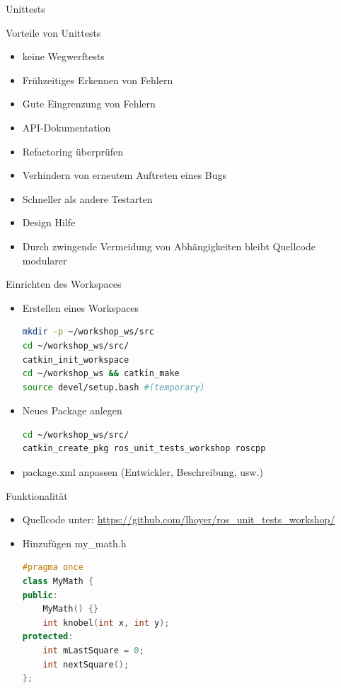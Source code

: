 \documentclass{beamer}
\begin{document}
\begin{frame}{Unittests}
	\begin{block}{Vorteile von Unittests}
	\begin{itemize}
		\pause
		\item keine Wegwerftests
		\item Frühzeitiges Erkennen von Fehlern
		\item Gute Eingrenzung von Fehlern
		\item API-Dokumentation
		\item Refactoring überprüfen
		\item Verhindern von erneutem Auftreten eines Bugs
		\item Schneller als andere Testarten
		\item Design Hilfe
		\item Durch zwingende Vermeidung von Abhängigkeiten bleibt Quellcode modularer
	\end{itemize}
	\end{block}
\end{frame}

\begin{frame}[fragile]{Einrichten des Workspaces}
\begin{itemize}
\item Erstellen eines Workspaces
\begin{lstlisting}[language=bash]
mkdir -p ~/workshop_ws/src
cd ~/workshop_ws/src/
catkin_init_workspace
cd ~/workshop_ws && catkin_make
source devel/setup.bash #(temporary)
\end{lstlisting}
\pause
\item Neues Package anlegen
\begin{lstlisting}[language=bash]
cd ~/workshop_ws/src/
catkin_create_pkg ros_unit_tests_workshop roscpp
\end{lstlisting}
\item package.xml anpassen (Entwickler, Beschreibung, usw.)
\end{itemize}
\end{frame}

\begin{frame}[fragile]{Funktionalität}
\begin{itemize}
\item Quellcode unter: \url{https://github.com/lhoyer/ros_unit_tests_workshop/}
\item Hinzufügen my\_math.h
\begin{lstlisting}[language=c++]
#pragma once
class MyMath {
public:
	MyMath() {}
	int knobel(int x, int y);
protected:
	int mLastSquare = 0;
	int nextSquare();
};
\end{lstlisting}
\end{itemize}
\end{frame}
\end{document}

